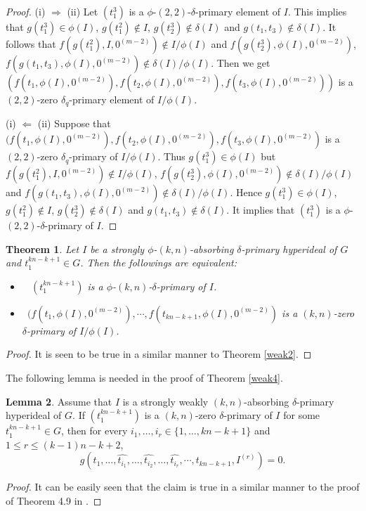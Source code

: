 \documentclass[preprint,review,10pt]{amsart}
\newtheorem{theorem}{Theorem}[section]
\theoremstyle{definition}
\newtheorem{lem}[theorem]{Lemma}
\theoremstyle{remark}
\numberwithin{equation}{section}
\begin{document}
\begin{proof}
(i) $\Longrightarrow $ (ii) Let $(t_1^3)$ is a $\phi$-$(2,2)$-$\delta$-primary element of $I$. This implies that $g(t_1^3) \in \phi(I)$, $g(t_1^2) \notin I$, $g(t_2^3) \notin \delta(I)$ and $g(t_1,t_3) \notin \delta(I)$. It follows that  $f(g(t_1^2),I,0^{(m-2)}) \notin I/\phi(I)$ and $f(g(t_2^3),\phi(I),0^{(m-2)}) $, $f(g(t_1,t_3),\phi(I),0^{(m-2)}) \notin \delta(I)/\phi(I)$. Then we get  $(f(t_1,\phi(I),0^{(m-2)}),f(t_2,\phi(I),0^{(m-2)}),f(t_3,\phi(I),0^{(m-2)}))$ is a $(2,2)$-zero $\delta_q$-primary element of $I/\phi(I)$.

(i)  $\Longleftarrow $ (ii) Suppose that $(f(t_1,\phi(I),0^{(m-2)}),f(t_2,\phi(I),0^{(m-2)}),f(t_3,\phi(I),0^{(m-2)})$ is a $(2,2)$-zero $\delta_q$-primary of $I/\phi(I)$. Thus $g(t_1^3) \in \phi(I)$ but $f(g(t_1^2),I,0^{(m-2)}) \notin I/\phi(I)$, $f(g(t_2^3),\phi(I),0^{(m-2)}) \notin \delta(I)/\phi(I)$ and $f(g(t_1,t_3),\phi(I),0^{(m-2)}) \notin \delta(I)/\phi(I)$. Hence $g(t_1^3) \in \phi(I)$, $g(t_1^2) \notin I$, $g(t_2^3) \notin \delta(I)$ and $g(t_1,t_3) \notin \delta(I)$. It implies that $(t_1^3)$ is a $\phi$-$(2,2)$-$\delta$-primary of $I$.
\end{proof}
\begin{theorem} \label{kweak2}
 Let $I$ be a strongly $\phi$-$(k,n)$-absorbing $\delta$-primary hyperideal of $G$ and  $t_1^{kn-k+1} \in G$. Then the followings are equivalent:
\begin{itemize} 
\item[\rm(i)]~ $(t_1^{kn-k+1})$ is a $\phi$-$(k,n)$-$\delta$-primary of $I$.
\item[\rm(ii)]~$(f(t_1,\phi(I),0^{(m-2)}),\cdots,f(t_{kn-k+1},\phi(I),0^{(m-2)})$ is a $(k,n)$-zero $\delta$-primary of $I/\phi(I)$.
\end{itemize}
\end{theorem}
\begin{proof}
It is seen to be true in a similar manner to Theorem \ref{weak2}.
\end{proof}
The following lemma is needed in the proof of Theorem \ref{weak4}.
\begin{lem} \label{madar2}
Assume that $I$ is a strongly weakly $(k,n)$-absorbing $\delta$-primary hyperideal of $G$. If $(t_1^{kn-k+1})$ is a $(k,n)$-zero $\delta$-primary of $I$ for some $t_1^{kn-k+1} \in G$, then for every $i_1,\ldots,i_r \in \{1,\ldots,kn-k+1\}$ and $1 \leq r \leq (k-1)n-k+2$, \[g(t_1,\ldots,\widehat{t_{i_1}},\ldots,\widehat{t_{i_2}},\ldots,\widehat{t_{i_r}},\cdots,t_{kn-k+1},I^{(r)}) =0.\] 
\end{lem}
\begin{proof}
It can be easily seen that the claim is true in a similar manner to the proof of
Theorem 4.9 in \cite{weak}. 
\end{proof}
\end{document}
